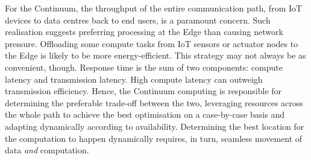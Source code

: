 
For the Continuum, the throughput of the entire communication path, from IoT devices to data centres back to end users, is a paramount concern. Such realisation suggests preferring processing at the Edge than causing network pressure. 
Offloading some compute tasks from IoT sensors or actuator nodes to the Edge is likely to be more energy-efficient. 
This strategy may not always be as convenient, though. 
Response time is the sum of two components: compute latency and transmission latency. High compute latency can outweigh transmission efficiency. 
Hence, the Continuum computing is responsible for determining the preferable trade-off between the two, leveraging resources across the whole path to achieve the best optimisation on a case-by-case basis and adapting dynamically according to availability. Determining the best location for the computation to happen dynamically requires, in turn, seamless movement of data \textit{and} computation.

